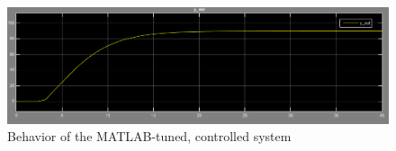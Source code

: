\begin{figure}[H]
\begin{center}
\includegraphics[width=1\linewidth]{images/general/system_control2}
\end{center}
\caption{Behavior of the MATLAB-tuned, controlled system}
\label{fig:system_control2}
\end{figure}
\newpage
